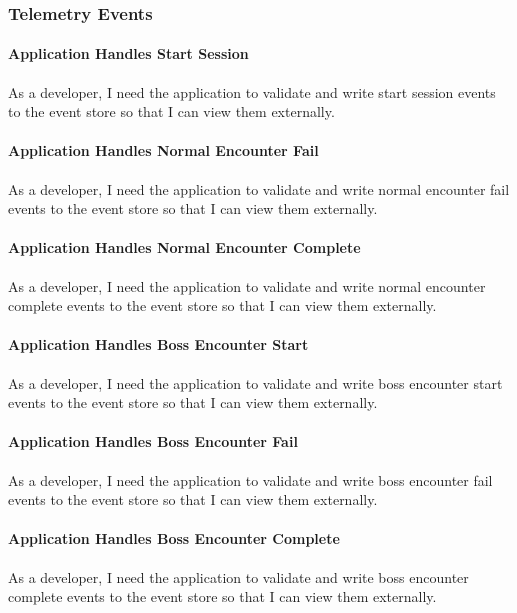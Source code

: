 \subsubsection{Telemetry Events}

\paragraph{Application Handles Start Session}
As a developer, I need the application to validate and write start session events to the event store so that I can view them externally.

\paragraph{Application Handles Normal Encounter Fail}
As a developer, I need the application to validate and write normal encounter fail events to the event store so that I can view them externally.

\paragraph{Application Handles Normal Encounter Complete}
As a developer, I need the application to validate and write normal encounter complete events to the event store so that I can view them externally.

\paragraph{Application Handles Boss Encounter Start}
As a developer, I need the application to validate and write boss encounter start events to the event store so that I can view them externally.

\paragraph{Application Handles Boss Encounter Fail}
As a developer, I need the application to validate and write boss encounter fail events to the event store so that I can view them externally.

\paragraph{Application Handles Boss Encounter Complete}
As a developer, I need the application to validate and write boss encounter complete events to the event store so that I can view them externally.

